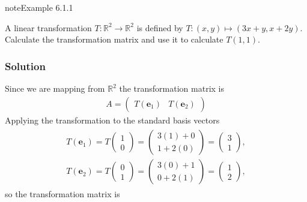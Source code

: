 \documentclass[letterpaper,10pt,english]{jupyterBook}
\begin{document}
\begin{sphinxadmonition}{note}{Example 6.1.1}



\sphinxAtStartPar
A linear transformation \(T:\mathbb{R}^2 \to \mathbb{R}^2\) is defined by \(T: (x, y) \mapsto (3x + y, x + 2y)\). Calculate the transformation matrix and use it to calculate \(T(1,1)\).
\subsubsection*{Solution}

\sphinxAtStartPar
Since we are mapping from \(\mathbb{R}^2\) the transformation matrix is
\begin{equation*}
\begin{split} A = \begin{pmatrix} T(\mathbf{e}_1) & T(\mathbf{e}_2) \end{pmatrix} \end{split}
\end{equation*}
\sphinxAtStartPar
Applying the transformation to the standard basis vectors
\begin{equation*}
\begin{split} \begin{align*}
    T(\mathbf{e}_1) = T\begin{pmatrix} 1 \\ 0 \end{pmatrix}
    = \begin{pmatrix} 3(1) + 0 \\ 1 + 2(0) \end{pmatrix}
    = \begin{pmatrix} 3 \\ 1 \end{pmatrix}, \\
    T(\mathbf{e}_2) = T\begin{pmatrix} 0 \\ 1 \end{pmatrix}
    = \begin{pmatrix} 3(0) + 1 \\ 0 + 2(1) \end{pmatrix}
    = \begin{pmatrix} 1 \\ 2 \end{pmatrix},
\end{align*} \end{split}
\end{equation*}
\sphinxAtStartPar
so the transformation matrix is
\begin{equation*}

\end{equation*}
\end{sphinxadmonition}
\end{document}
